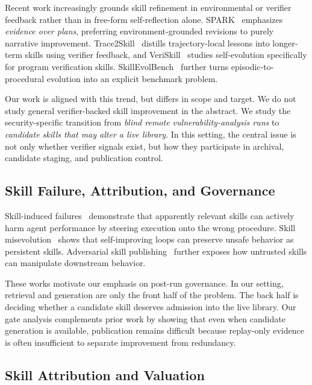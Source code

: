 ﻿\documentclass[preprint,12pt]{elsarticle}
\begin{document}
Recent work increasingly grounds skill refinement in environmental or
verifier feedback rather than in free-form self-reflection alone.
SPARK~\cite{spark} emphasizes \emph{evidence over plans}, preferring
environment-grounded revisions to purely narrative improvement.
Trace2Skill~\cite{trace2skill} distills trajectory-local lessons into
longer-term skills using verifier feedback, and
VeriSkill~\cite{veriskill} studies self-evolution specifically for program
verification skills.  SkillEvolBench~\cite{skillevolbench} further turns
episodic-to-procedural evolution into an explicit benchmark problem.

Our work is aligned with this trend, but differs in scope and target.  We
do not study general verifier-backed skill improvement in the abstract.
We study the security-specific transition from \emph{blind remote
vulnerability-analysis runs} to \emph{candidate skills that may alter a
live library}.  In this setting, the central issue is not only whether
verifier signals exist, but how they participate in archival, candidate
staging, and publication control.

\subsection{Skill Failure, Attribution, and Governance}

Skill-induced failures~\cite{skillharmful} demonstrate that apparently
relevant skills can actively harm agent performance by steering execution
onto the wrong procedure.  Skill misevolution~\cite{misevolution} shows
that self-improving loops can preserve unsafe behavior as persistent
skills.  Adversarial skill publishing~\cite{detourhijack} further exposes
how untrusted skills can manipulate downstream behavior.

These works motivate our emphasis on post-run governance.  In our setting,
retrieval and generation are only the front half of the problem.  The back
half is deciding whether a candidate skill deserves admission into the live
library.  Our gate analysis complements prior work by showing that even
when candidate generation is available, publication remains difficult
because replay-only evidence is often insufficient to separate improvement
from redundancy.

\subsection{Skill Attribution and Valuation}
\end{document}

